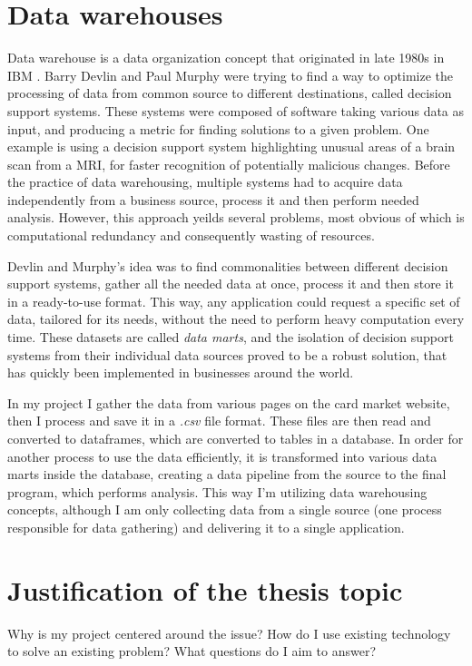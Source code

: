 \section{Data warehouses}
Data warehouse is a data organization concept that originated in late 1980s in IBM \cite{dataWarehouses}. Barry Devlin and Paul Murphy were trying to find a way to optimize the processing of data from common source to different destinations, called decision support systems. These systems were composed of software taking various data as input, and producing a metric for finding solutions to a given problem. One example is using a decision support system highlighting unusual areas of a brain scan from a MRI, for faster recognition of potentially malicious changes. Before the practice of data warehousing, multiple systems had to acquire data independently from a business source, process it and then perform needed analysis. However, this approach yeilds several problems, most obvious of which is computational redundancy and consequently wasting of resources. \par
Devlin and Murphy's idea was to find commonalities between different decision support systems, gather all the needed data at once, process it and then store it in a ready-to-use format. This way, any application could request a specific set of data, tailored for its needs, without the need to perform heavy computation every time. These datasets are called \textit{data marts}, and the isolation of decision support systems from their individual data sources proved to be a robust solution, that has quickly been implemented in businesses around the world. \par
In my project I gather the data from various pages on the card market website, then I process and save it in a \textit{.csv} file format. These files are then read and converted to dataframes, which are converted to tables in a database. In order for another process to use the data efficiently, it is transformed into various data marts inside the database, creating a data pipeline from the source to the final program, which performs analysis. This way I'm utilizing data warehousing concepts, although I am only collecting data from a single source (one process responsible for data gathering) and delivering it to a single application.


\section{Justification of the thesis topic}
Why is my project centered around the issue?
How do I use existing technology to solve an existing problem?
What questions do I aim to answer?
